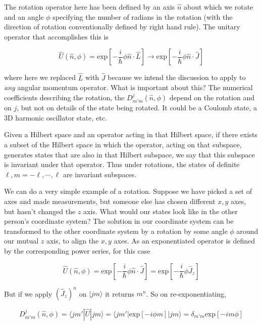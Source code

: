 The rotation operator here has been defined by an axis $\hat{n}$ about which we
rotate and an angle $\phi$ specifying the number of radians in the rotation
(with the direction of rotation conventionally defined by right hand rule). The
unitary operator that accomplishes this is 

\[
\hat{U}(\hat{n}, \phi) = \text{exp} \left[ -\frac{i}{\hbar} \phi  \hat{n} \cdot
\hat{L} \right] \rightarrow \text{exp} \left[ -\frac{i}{\hbar} \phi \hat{n}
\cdot \hat{J}\right]
\] \vspace{3px}

where here we replaced $\hat{L}$ with $\hat{J}$ because we intend the
discussion to apply to \textit{any} angular momentum operator. What is
important about this? The numerical coefficients describing the rotation, the
$D_{m'm}^j(\hat{n}, \phi)$ depend on the rotation and on $j$, but not on
details of the state being rotated. It could be a Coulomb state, a 3D harmonic
oscillator state, etc. 

Given a Hilbert space and an operator acting in that Hilbert space, if there exists a subset of
the Hilbert space in which the operator, acting on that subspace, generates states that are also
in that Hilbert subspace, we say that this subspace is invariant under that operator. Thus under
rotations, the states of definite $\ell, m = -\ell, \cdots , \ell$ are invariant subspaces.

We can do a very simple example of a rotation. Suppose we have picked a set of axes and made
measurements, but someone else has chosen different $x, y$ axes, but hasn't
changed the $z$ axis. What
would our states look like in the other person’s coordinate system? The solution in our coordinate
system can be transformed to the other coordinate system by a rotation by some
angle $\phi$ around our
mutual $z$ axis, to align the $x, y$ axes. As an exponentiated operator is defined by the corresponding
power series, for this case


\[
\hat{U}(\hat{n}, \phi) = \text{exp} \left[ -\frac{i}{\hbar}\phi \hat{n} \cdot
\hat{J}\right] = \text{exp} \left[ -\frac{i}{\hbar} \phi \hat{J}_z\right] 
\] \vspace{3px}


But if we apply $(\hat{J}_z)^n$ on $|jm\rangle$ it returns $m^n$. So on
re-exponentiating, 

\[
  D_{m'm}^j (\hat{n}, \phi) = \langle jm' | \hat{U}|jm\rangle = \langle jm'
  | \text{exp} [-i\phi m] | jm\rangle = \delta_{m'm} \text{exp}  [-i m\phi ]
\] \vspace{3px}

